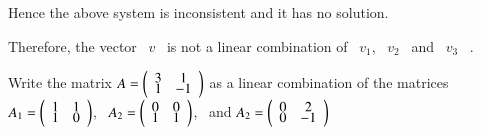 \documentclass[12pt]{article}
\renewenvironment{pmatrix}
{\left(\begin{array}{ccc}}
{\end{array}\right)}
\begin{document}
Hence the above system is inconsistent and it has no solution.

Therefore, the vector \ $v$ \ is not a linear combination of \ $v_1$, \ $v_2$ \ and \ $v_3$ \ .

\vspace{5ex}
\vspace{1ex}
 Write the matrix $A=\begin{pmatrix} 3 & 1 \\[-1ex] 1 & -1 \end{pmatrix}$ as a linear combination of the matrices $A_1=\begin{pmatrix} 1 & 1 \\[-1ex] 1 & 0 \end{pmatrix}$, \ $A_2=\begin{pmatrix} 0 & 0 \\[-1ex] 1 & 1 \end{pmatrix}$, \ and $A_2=\begin{pmatrix} 0 & 2 \\[-1ex] 0 & -1 \end{pmatrix}$
\end{document}
